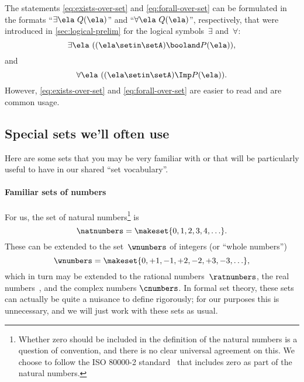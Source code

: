 \begin{remark}
    The statements \cref{eq:exists-over-set} and \cref{eq:forall-over-set} can be formulated in the formats ``$\exists \ela \ Q(\ela)$'' and ``$\forall \ela \ Q(\ela)$'', respectively, that were introduced in \cref{sec:logical-prelim} for the logical symbols~$\exists$ and~$\forall$:
    \begin{equation}
        \exists \ela \  ((\ela \setin \setA) \booland P(\ela)),
    \end{equation}
    and
    \begin{equation}
        \forall \ela\  ((\ela\setin \setA) \Imp P(\ela)).
    \end{equation}
    However, \cref{eq:exists-over-set} and \cref{eq:forall-over-set} are easier to read and are common usage.
\end{remark}

\subsection{Special sets we'll often use}

\label{sec:natnumbers}
\label{sec:wnumbers}
\label{sec:ratnumbers}
\label{sec:reals}

Here are some sets that you may be very familiar with or that will be particularly useful to have in our shared ``set vocabulary''. 

\paragraph{Familiar sets of numbers}
For us, the set of natural numbers\footnote{
    Whether zero should be included in the definition of the natural numbers is a question of convention, and there is no clear universal agreement on this.
    We choose to follow the ISO 80000-2 standard~\cite{ISO:2009:IQU} that includes zero as part of the natural numbers.
} is
%
\begin{equation}
    \natnumbers = \makeset{0, 1, 2, 3, 4, \ldots }.
\end{equation}
%
These can be extended to the set~$\wnumbers$ of integers (or ``whole numbers'')
\begin{equation}
    \wnumbers = \makeset{ 0, +1, -1, +2, -2, +3, -3, \ldots},
\end{equation}
%
which in turn may be extended to the  rational numbers~$\ratnumbers$, the real numbers~\reals, and the complex numbers $\cnumbers$. In formal set theory, these sets can actually be quite a nuisance to define rigorously; for our purposes this is unnecessary, and we will just work with these sets as usual.

